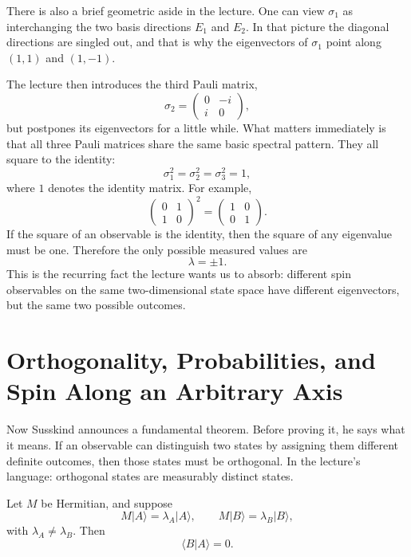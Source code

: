 There is also a brief geometric aside in the lecture. One can view \(\sigma_1\) as interchanging the two basis directions \(E_1\) and \(E_2\). In that picture the diagonal directions are singled out, and that is why the eigenvectors of \(\sigma_1\) point along \((1,1)\) and \((1,-1)\).

The lecture then introduces the third Pauli matrix,
\begin{equation}
\sigma_2=
\begin{pmatrix}
0&-i\\
i&0
\end{pmatrix},
\end{equation}
but postpones its eigenvectors for a little while. What matters immediately is that all three Pauli matrices share the same basic spectral pattern. They all square to the identity:
\begin{equation}
\sigma_1^2=\sigma_2^2=\sigma_3^2=1,
\end{equation}
where \(1\) denotes the identity matrix. For example,
\begin{equation}
\begin{pmatrix}
0&1\\
1&0
\end{pmatrix}^2
=
\begin{pmatrix}
1&0\\
0&1
\end{pmatrix}.
\end{equation}
If the square of an observable is the identity, then the square of any eigenvalue must be one. Therefore the only possible measured values are
\begin{equation}
\lambda=\pm1.
\end{equation}
This is the recurring fact the lecture wants us to absorb: different spin observables on the same two-dimensional state space have different eigenvectors, but the same two possible outcomes.

\section{Orthogonality, Probabilities, and Spin Along an Arbitrary Axis}

Now Susskind announces a fundamental theorem. Before proving it, he says what it means. If an observable can distinguish two states by assigning them different definite outcomes, then those states must be orthogonal. In the lecture's language: orthogonal states are measurably distinct states.

\begin{theorem}
Let \(M\) be Hermitian, and suppose
\begin{equation}
M|A\rangle=\lambda_A|A\rangle,
\qquad
M|B\rangle=\lambda_B|B\rangle,
\end{equation}
with \(\lambda_A\neq\lambda_B\). Then
\begin{equation}
\langle B|A\rangle=0.
\end{equation}
\end{theorem}

